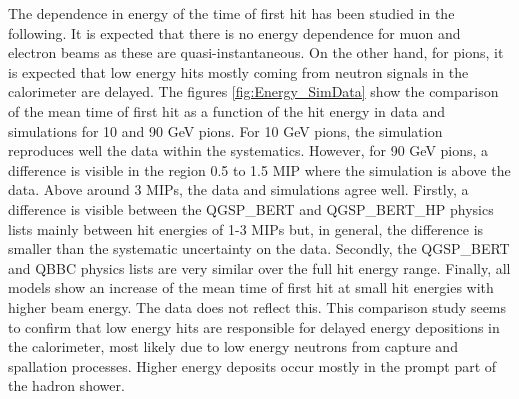 \documentclass{JINST}
\begin{document}
The dependence in energy of the time of first hit has been studied in the following. It is expected that there is no energy dependence for muon and electron beams as these are quasi-instantaneous. On the other hand, for pions, it is expected that low energy hits mostly coming from neutron signals in the calorimeter are delayed. The figures \ref{fig:Energy_SimData} show the comparison of the mean time of first hit as a function of the hit energy in data and simulations for 10 and 90 GeV pions. For 10 GeV pions, the simulation reproduces well the data within the systematics. However, for 90 GeV pions, a difference is visible in the region 0.5 to 1.5 MIP where the simulation is above the data. Above around 3 MIPs, the data and simulations agree well. Firstly, a difference is visible between the QGSP\_BERT and QGSP\_BERT\_HP physics lists mainly between hit energies of 1-3 MIPs but, in general, the difference is smaller than the systematic uncertainty on the data. Secondly, the QGSP\_BERT and QBBC physics lists are very similar over the full hit energy range. Finally, all models show an increase of the mean time of first hit at small hit energies with higher beam energy. The data does not reflect this. This comparison study seems to confirm that low energy hits are responsible for delayed energy depositions in the calorimeter, most likely due to low energy neutrons from capture and spallation processes. Higher energy deposits occur mostly in the prompt part of the hadron shower.
\end{document}
